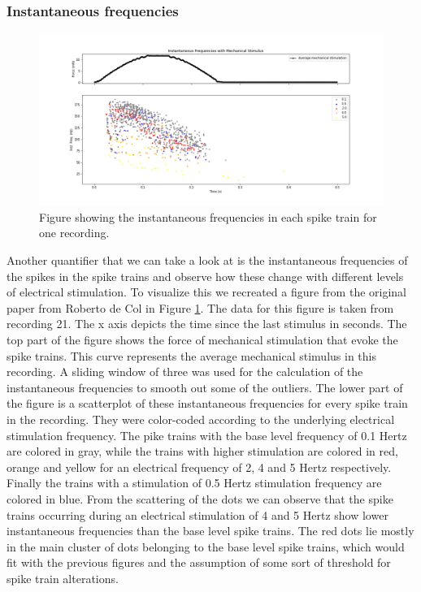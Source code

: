 \subsubsection{Instantaneous frequencies}
\begin{figure}
	\includegraphics[width = \textwidth]{src/pic/11_12_13U1b_inst_freqs}
	\caption{Figure showing the instantaneous frequencies in each spike train for one recording.}
	\label{fig:inst_freqs}
\end{figure}
Another quantifier that we can take a look at is the instantaneous frequencies of the spikes in the spike trains and observe how these change with different levels of electrical stimulation. To visualize this we recreated a figure from the original paper from Roberto de Col in Figure \ref{fig:inst_freqs}. The data for this figure is taken from recording 21. The x axis depicts the time since the last stimulus in seconds. The top part of the figure shows the force of mechanical stimulation that evoke the spike trains. This curve represents the average mechanical stimulus in this recording. A sliding window of three was used for the calculation of the instantaneous frequencies to smooth out some of the outliers. The lower part of the figure is a scatterplot of these instantaneous frequencies for every spike train in the recording. They were color-coded according to the underlying electrical stimulation frequency. The pike trains with the base level frequency of 0.1 Hertz are colored in gray, while the trains with higher stimulation are colored in red, orange and yellow for an electrical frequency of 2, 4 and 5 Hertz respectively. Finally the trains with a stimulation of 0.5 Hertz stimulation frequency are colored in blue. From the scattering of the dots we can observe that the spike trains occurring during an electrical stimulation of 4 and 5 Hertz show lower instantaneous frequencies than the base level spike trains. The red dots lie mostly in the main cluster of dots belonging to the base level spike trains, which would fit with the previous figures and the assumption of some sort of threshold for spike train alterations.



